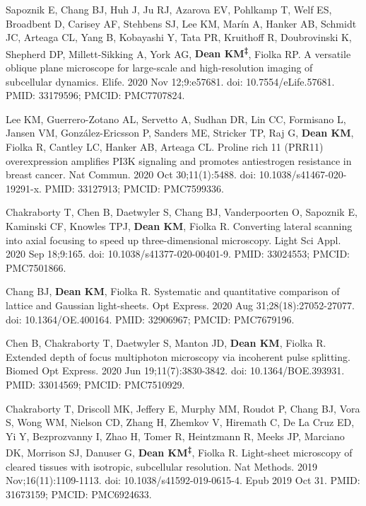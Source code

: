 \begin{etaremune}
\item  Sapoznik E, Chang BJ, Huh J, Ju RJ, Azarova EV, Pohlkamp T, Welf ES, Broadbent D, Carisey AF, Stehbens SJ, Lee KM, Marín A, Hanker AB, Schmidt JC, Arteaga CL, Yang B, Kobayashi Y, Tata PR, Kruithoff R, Doubrovinski K, Shepherd DP, Millett-Sikking A, York AG, \textbf{Dean KM\textsuperscript{‡}}, Fiolka RP. A versatile oblique plane microscope for large-scale and high-resolution imaging of subcellular dynamics. Elife. 2020 Nov 12;9:e57681. doi: 10.7554/eLife.57681. PMID: 33179596; PMCID: PMC7707824.

\item Lee KM, Guerrero-Zotano AL, Servetto A, Sudhan DR, Lin CC, Formisano L, Jansen VM, González-Ericsson P, Sanders ME, Stricker TP, Raj G, \textbf{Dean KM}, Fiolka R, Cantley LC, Hanker AB, Arteaga CL. Proline rich 11 (PRR11) overexpression amplifies PI3K signaling and promotes antiestrogen resistance in breast cancer. Nat Commun. 2020 Oct 30;11(1):5488. doi: 10.1038/s41467-020-19291-x. PMID: 33127913; PMCID: PMC7599336.

\item Chakraborty T, Chen B, Daetwyler S, Chang BJ, Vanderpoorten O, Sapoznik E, Kaminski CF, Knowles TPJ, \textbf{Dean KM}, Fiolka R. Converting lateral scanning into axial focusing to speed up three-dimensional microscopy. Light Sci Appl. 2020 Sep 18;9:165. doi: 10.1038/s41377-020-00401-9. PMID: 33024553; PMCID: PMC7501866.

\item Chang BJ, \textbf{Dean KM}, Fiolka R. Systematic and quantitative comparison of lattice and Gaussian light-sheets. Opt Express. 2020 Aug 31;28(18):27052-27077. doi: 10.1364/OE.400164. PMID: 32906967; PMCID: PMC7679196.

\item Chen B, Chakraborty T, Daetwyler S, Manton JD, \textbf{Dean KM}, Fiolka R. Extended depth of focus multiphoton microscopy via incoherent pulse splitting. Biomed Opt Express. 2020 Jun 19;11(7):3830-3842. doi: 10.1364/BOE.393931. PMID: 33014569; PMCID: PMC7510929.

\item Chakraborty T, Driscoll MK, Jeffery E, Murphy MM, Roudot P, Chang BJ, Vora S, Wong WM, Nielson CD, Zhang H, Zhemkov V, Hiremath C, De La Cruz ED, Yi Y, Bezprozvanny I, Zhao H, Tomer R, Heintzmann R, Meeks JP, Marciano DK, Morrison SJ, Danuser G, \textbf{Dean KM\textsuperscript{‡}}, Fiolka R. Light-sheet microscopy of cleared tissues with isotropic, subcellular resolution. Nat Methods. 2019 Nov;16(11):1109-1113. doi: 10.1038/s41592-019-0615-4. Epub 2019 Oct 31. PMID: 31673159; PMCID: PMC6924633.


\end{etaremune}
